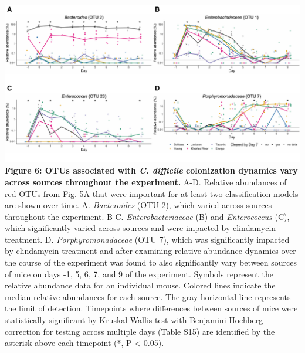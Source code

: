 \documentclass[
  11pt,
]{article}
\begin{document}
\includegraphics{figure_6.pdf} \textbf{Figure 6: OTUs associated with
\emph{C. difficile} colonization dynamics vary across sources throughout
the experiment.} A-D. Relative abundances of red OTUs from Fig. 5A that
were important for at least two classification models are shown over
time. A. \emph{Bacteroides} (OTU 2), which varied across sources
throughout the experiment. B-C. \emph{Enterobacteriaceae} (B) and
\emph{Enterococcus} (C), which significantly varied across sources and
were impacted by clindamycin treatment. D. \emph{Porphyromonadaceae}
(OTU 7), which was significantly impacted by clindamycin treatment and
after examining relative abundance dynamics over the course of the
experiment was found to also significantly vary between sources of mice
on days -1, 5, 6, 7, and 9 of the experiment. Symbols represent the
relative abundance data for an individual mouse. Colored lines indicate
the median relative abundances for each source. The gray horizontal line
represents the limit of detection. Timepoints where differences between
sources of mice were statistically significant by Kruskal-Wallis test
with Benjamini-Hochberg correction for testing across multiple days
(Table S15) are identified by the asterisk above each timepoint (*, P
\textless{} 0.05).

\newpage
\end{document}
